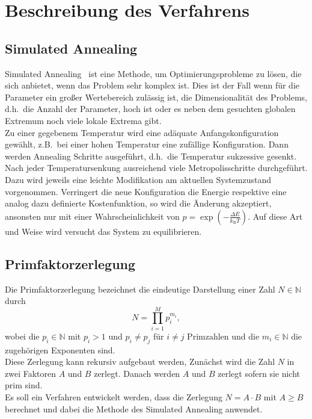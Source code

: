 \chapter{Beschreibung des Verfahrens}

\section{Simulated Annealing}
Simulated Annealing~\parencite{nr} ist eine Methode, um Optimierungsprobleme zu lösen, die sich anbietet, wenn das Problem sehr komplex ist. Dies ist der Fall wenn für die Parameter ein großer Wertebereich zulässig ist, die Dimensionalität des Problems, d.h.\ die Anzahl der Parameter, hoch ist oder es neben dem gesuchten globalen Extremum noch viele lokale Extrema gibt. \\
Zu einer gegebenem Temperatur wird eine adäquate Anfangskonfiguration gewählt, z.B.\ bei einer hohen Temperatur eine zufällige Konfiguration. Dann werden Annealing Schritte ausgeführt, d.h.\ die Temperatur sukzessive gesenkt. Nach jeder Temperatursenkung ausreichend viele Metropolisschritte durchgeführt. Dazu wird jeweils eine leichte Modifikation am aktuellen Systemzustand vorgenommen. Verringert die neue Konfiguration die Energie respektive eine analog dazu definierte Kostenfunktion, so wird die Änderung akzeptiert, ansonsten nur mit einer Wahrscheinlichkeit von $p=\exp\left(-\frac{\Delta E}{k_\mathrm{B}T}\right)$. Auf diese Art und Weise wird versucht das System zu equilibrieren.

\section{Primfaktorzerlegung}
Die Primfaktorzerlegung bezeichnet die eindeutige Darstellung einer Zahl $N\in\mathbb{N}$ durch
\begin{equation*}
  N=\prod\limits_{i=1}^M p_i^{m_i},
\end{equation*}
wobei die $p_i\in\mathbb{N}$ mit $p_i>1$ und $p_i\neq p_j$ für $i\neq j$ Primzahlen und die $m_i\in\mathbb{N}$ die zugehörigen Exponenten sind.\\
Diese Zerlegung kann rekursiv aufgebaut werden, Zunächst wird die Zahl $N$ in zwei Faktoren $A$ und $B$ zerlegt. Danach werden $A$ und $B$ zerlegt sofern sie nicht prim sind.\\
Es soll ein Verfahren entwickelt werden, dass die Zerlegung $N=A\cdot B$ mit $A\geq B$ berechnet und dabei die Methode des Simulated Annealing anwendet.\\

